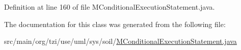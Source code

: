Definition at line 160 of file M\-Conditional\-Execution\-Statement.\-java.



The documentation for this class was generated from the following file\-:\begin{DoxyCompactItemize}
\item 
src/main/org/tzi/use/uml/sys/soil/\hyperlink{_m_conditional_execution_statement_8java}{M\-Conditional\-Execution\-Statement.\-java}\end{DoxyCompactItemize}
